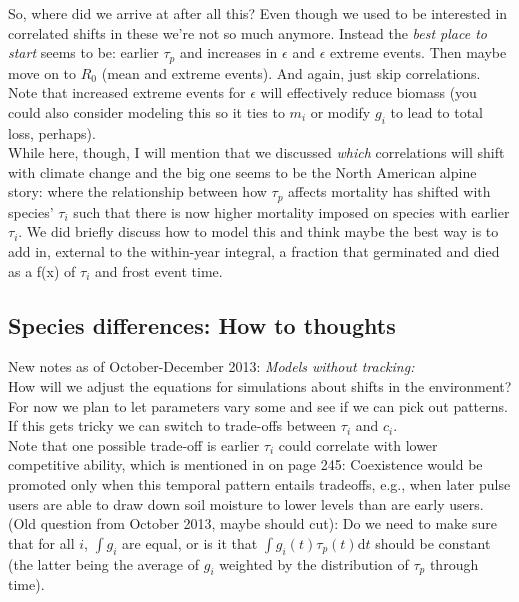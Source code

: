 \documentclass[11pt,a4paper,oneside]{article}
\begin{document}
So, where did we arrive at after all this? Even though we used to be interested in correlated shifts in these we're not so much anymore. Instead the \emph{best place to start} seems to be: earlier \(\tau_{p}\) and increases in \(\epsilon\) and \(\epsilon\) extreme events. Then maybe move on to \(R_{0}\) (mean and extreme events). And again, just skip correlations.\\

Note that increased extreme events for \(\epsilon\)  will effectively reduce biomass (you could also consider modeling this so it ties to \(m_{i}\) or modify \(g_{i}\) to lead to total loss, perhaps).\\

While here, though, I will mention that we discussed \emph{which} correlations will shift with climate change and the big one seems to be the North American alpine story: where the relationship between how \(\tau_{p}\) affects mortality has shifted with species' \(\tau_{i}\) such that there is now higher mortality imposed on species with earlier \(\tau_{i}\). We did briefly discuss how to model this and think maybe the best way is to add in, external to the within-year integral, a fraction that germinated and died as a f(x) of \(\tau_{i}\)  and frost event time.\\

\subsection{Species differences: How to thoughts}
\noindent New notes as of October-December 2013: \emph{Models without tracking:}\\
How will we adjust the equations for simulations about shifts in the environment? For now we plan to let parameters vary some and see if we can pick out patterns. If this gets tricky we can switch to trade-offs between \(\tau_{i}\) and \(c_{i}\). \\

Note that one possible trade-off is earlier \(\tau_{i}\) could correlate with lower competitive ability, which is mentioned in \citet{Chesson:2004eo} on page 245: Coexistence would be promoted
only when this temporal pattern entails tradeoffs, e.g.,
when later pulse users are able to draw down soil moisture
to lower levels than are early users.\\

(Old question from October 2013, maybe should cut): Do we need to make sure that for all \(i\), \(\int g_{i}\) are equal, or is it that \(\int g_{i}(t)\tau_{p}(t)\mathrm{d}t\) should be constant (the latter being the average of \(g_{i}\) weighted by the distribution of \(\tau_{p}\) through time).\\
\end{document}
